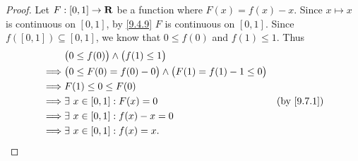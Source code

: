 \begin{proof}
  Let \(F : [0, 1] \to \mathbf{R}\) be a function where \(F(x) = f(x) - x\).
  Since \(x \mapsto x\) is continuous on \([0, 1]\), by \cref{9.4.9} \(F\) is continuous on \([0, 1]\).
  Since \(f([0, 1]) \subseteq [0, 1]\), we know that \(0 \leq f(0)\) and \(f(1) \leq 1\).
  Thus
  \begin{align*}
             & \big(0 \leq f(0)\big) \land \big(f(1) \leq 1\big)                                                  \\
    \implies & \big(0 \leq F(0) = f(0) - 0\big) \land \big(F(1) = f(1) - 1 \leq 0\big)                            \\
    \implies & F(1) \leq 0 \leq F(0)                                                                              \\
    \implies & \exists\ x \in [0, 1] : F(x) = 0                                        & \text{(by \cref{9.7.1})} \\
    \implies & \exists\ x \in [0, 1] : f(x) - x = 0                                                               \\
    \implies & \exists\ x \in [0, 1] : f(x) = x.
  \end{align*}
\end{proof}